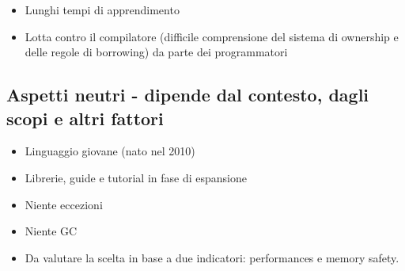 \begin{itemize}
  \item Lunghi tempi di apprendimento
  \item Lotta contro il compilatore (difficile comprensione del sistema di
ownership e delle regole di borrowing) da parte dei programmatori
\end{itemize}

\subsection{Aspetti neutri - dipende dal contesto, dagli scopi e altri fattori}

\begin{itemize}
  \item Linguaggio giovane (nato nel 2010)
  \item Librerie, guide e tutorial in fase di espansione
  \item Niente eccezioni
  \item Niente GC
  \item Da valutare la scelta in base a due indicatori: performances e memory safety.
\end{itemize}
